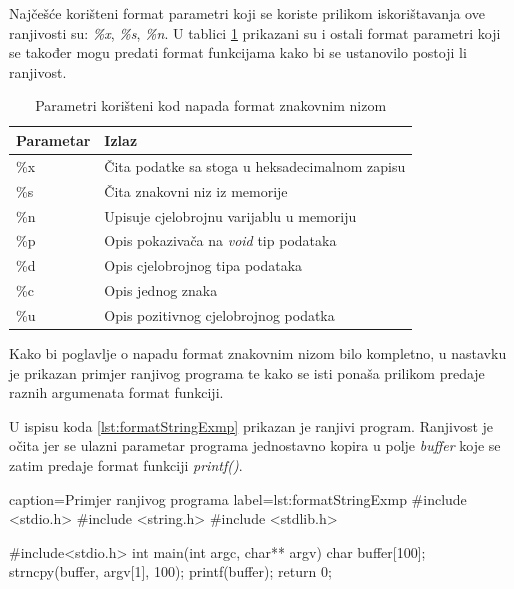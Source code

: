 \documentclass[times, utf8, diplomski, numeric]{fer}
\begin{document}
Najčešće korišteni format parametri koji se koriste prilikom				%
iskorištavanja ove ranjivosti su: \emph{\%x}, \emph{\%s}, \emph{\%n}.
U tablici \ref{tbl:format_parameters} prikazani su i ostali
format parametri koji se također mogu predati format funkcijama
kako bi se ustanovilo postoji li ranjivost.

\begin{table}[htb]
\small
\caption{Parametri korišteni kod napada format znakovnim nizom}
\label{tbl:format_parameters}
\centering
\begin{tabular}{|l|p{8cm}|}
\hline
Parametar & Izlaz \\ \hline
\%x & Čita podatke sa stoga u heksadecimalnom zapisu \\ \hline
\%s & Čita znakovni niz iz memorije \\ \hline
\%n & Upisuje cjelobrojnu varijablu u memoriju \\ \hline
\%p & Opis pokazivača na \emph{void} tip podataka \\ \hline
\%d & Opis cjelobrojnog tipa podataka \\ \hline
\%c & Opis jednog znaka \\ \hline
\%u & Opis pozitivnog cjelobrojnog podatka \\ \hline
\end{tabular}
\end{table}

Kako bi poglavlje o napadu format znakovnim nizom bilo kompletno,
u nastavku je prikazan primjer ranjivog programa te kako se isti
ponaša prilikom predaje raznih argumenata format funkciji.

U ispisu koda \ref{lst:formatStringExmp} prikazan je ranjivi
program. Ranjivost je očita jer se ulazni parametar programa
jednostavno kopira u polje \emph{buffer} koje se zatim predaje
format funkciji \emph{printf()}. 

\pagebreak %

\begin{ispis} {caption=Primjer ranjivog programa} {label=lst:formatStringExmp}
#include  <stdio.h>
#include  <string.h>
#include  <stdlib.h>

#include<stdio.h>
int main(int argc, char** argv) {
	char buffer[100];
	strncpy(buffer, argv[1], 100);
	printf(buffer);
	return 0;
}
\end{ispis}
\end{document}
